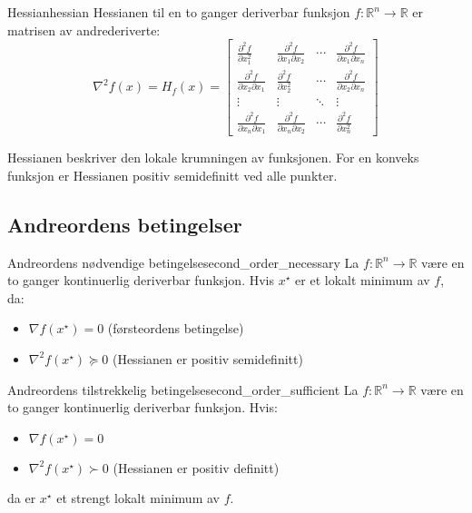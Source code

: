 \begin{definition}{Hessian}{hessian}
	Hessianen til en to ganger deriverbar funksjon $f: \mathbb{R}^n \to \mathbb{R}$ er matrisen av andrederiverte:
	\[
		\nabla^2 f(x) = H_f(x) = \begin{bmatrix}
			\frac{\partial^2 f}{\partial x_1^2}            & \frac{\partial^2 f}{\partial x_1 \partial x_2} & \cdots & \frac{\partial^2 f}{\partial x_1 \partial x_n} \\
			\frac{\partial^2 f}{\partial x_2 \partial x_1} & \frac{\partial^2 f}{\partial x_2^2}            & \cdots & \frac{\partial^2 f}{\partial x_2 \partial x_n} \\
			\vdots                                         & \vdots                                         & \ddots & \vdots                                         \\
			\frac{\partial^2 f}{\partial x_n \partial x_1} & \frac{\partial^2 f}{\partial x_n \partial x_2} & \cdots & \frac{\partial^2 f}{\partial x_n^2}
		\end{bmatrix}
	\]
\end{definition}

Hessianen beskriver den lokale krumningen av funksjonen. For en konveks funksjon er Hessianen positiv semidefinitt ved alle punkter.

\subsection{Andreordens betingelser}

\begin{theorem}{Andreordens nødvendige betingelse}{second_order_necessary}
	La $f: \mathbb{R}^n \to \mathbb{R}$ være en to ganger kontinuerlig deriverbar funksjon. Hvis $x^\star$ er et lokalt minimum av $f$, da:
	\begin{itemize}
		\item $\nabla f(x^\star) = 0$ (førsteordens betingelse)
		\item $\nabla^2 f(x^\star) \succeq 0$ (Hessianen er positiv semidefinitt)
	\end{itemize}
\end{theorem}

\begin{theorem}{Andreordens tilstrekkelig betingelse}{second_order_sufficient}
	La $f: \mathbb{R}^n \to \mathbb{R}$ være en to ganger kontinuerlig deriverbar funksjon. Hvis:
	\begin{itemize}
		\item $\nabla f(x^\star) = 0$
		\item $\nabla^2 f(x^\star) \succ 0$ (Hessianen er positiv definitt)
	\end{itemize}
	da er $x^\star$ et strengt lokalt minimum av $f$.
\end{theorem}

